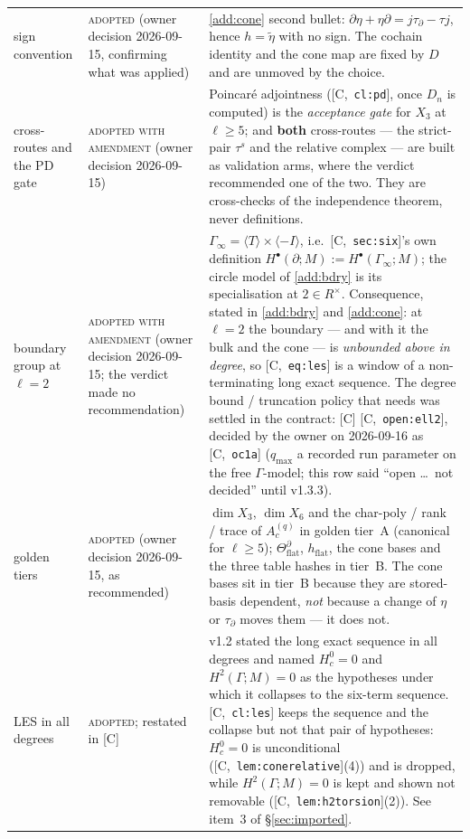 \documentclass[11pt]{article}
\theoremstyle{remark}
\newcommand{\Ga}{\Gamma}
\newcommand{\HA}[1]{[C,~\texttt{#1}]}      %
\begin{document}
\begin{center}
\begin{longtable}{@{}>{\raggedright\arraybackslash}p{2.4cm}>{\raggedright\arraybackslash}p{2.3cm}>{\raggedright\arraybackslash}p{10.8cm}@{}}
sign convention & \textsc{adopted} (owner decision 2026-09-15, confirming what was applied) & \ref{add:cone} second bullet: $\partial\eta+\eta\partial=j\tau_\partial-\tau j$, hence $h=\tilde\eta$ with no sign. The cochain identity and the cone map are fixed by $D$ and are unmoved by the choice. \\
cross-routes and the PD gate & \textsc{adopted with amendment} (owner decision 2026-09-15) & Poincar\'e adjointness (\HA{cl:pd}, once $D_n$ is computed) is the \emph{acceptance gate} for $X_3$ at $\ell\ge5$; and \textbf{both} cross-routes --- the strict-pair $\tau^s$ and the relative complex --- are built as validation arms, where the verdict recommended one of the two. They are cross-checks of the independence theorem, never definitions. \\
boundary group at $\ell=2$ & \textsc{adopted with amendment} (owner decision 2026-09-15; the verdict made no recommendation) & $\Ga_\infty=\langle T\rangle\times\langle-I\rangle$, i.e.\ \HA{sec:six}'s own definition $H^\bullet(\partial;M):=H^\bullet(\Ga_\infty;M)$; the circle model of \ref{add:bdry} is its specialisation at $2\in R^\times$. Consequence, stated in \ref{add:bdry} and \ref{add:cone}: at $\ell=2$ the boundary --- and with it the bulk and the cone --- is \emph{unbounded above in degree}, so \HA{eq:les} is a window of a non-terminating long exact sequence. The degree bound / truncation policy that needs was settled in the contract: [C] \HA{open:ell2}, decided by the owner on 2026-09-16 as \HA{oc1a} ($q_{\max}$ a recorded run parameter on the free $\Ga$-model; this row said ``open \ldots\ not decided'' until v1.3.3). \\
golden tiers & \textsc{adopted} (owner decision 2026-09-15, as recommended) & $\dim X_3$, $\dim X_6$ and the char-poly / rank / trace of $A_c^{(q)}$ in golden tier~A (canonical for $\ell\ge5$); $\Theta^\partial_{\mathrm{flat}}$, $h_{\mathrm{flat}}$, the cone bases and the three table hashes in tier~B. The cone bases sit in tier~B because they are stored-basis dependent, \emph{not} because a change of $\eta$ or $\tau_\partial$ moves them --- it does not. \\
LES in all degrees & \textsc{adopted}; restated in [C] & v1.2 stated the long exact sequence in all degrees and named $H^0_c=0$ and $H^2(\Ga;M)=0$ as the hypotheses under which it collapses to the six-term sequence. \HA{cl:les} keeps the sequence and the collapse but not that pair of hypotheses: $H^0_c=0$ is unconditional (\HA{lem:conerelative}(4)) and is dropped, while $H^2(\Ga;M)=0$ is kept and shown not removable (\HA{lem:h2torsion}(2)). See item~3 of \S\ref{sec:imported}. \\

\end{longtable}
\end{center}
\end{document}
